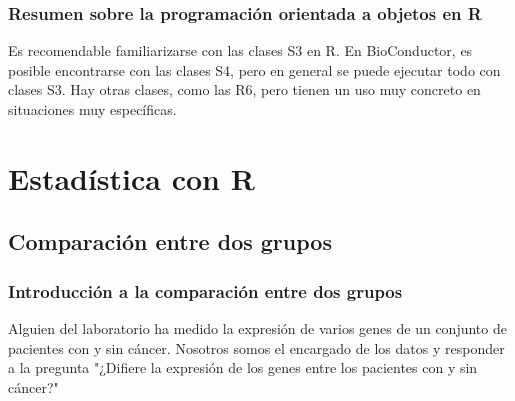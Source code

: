 \documentclass{config/apuntes}\usepackage[]{graphicx}\usepackage[]{xcolor}
\begin{document}
\section{Resumen sobre la programación orientada a objetos en R}
Es recomendable familiarizarse con las clases S3 en R. En BioConductor, es posible encontrarse con las clases S4, pero en general se puede ejecutar todo con clases S3. Hay otras clases, como las R6, pero tienen un uso muy concreto en situaciones muy específicas.

\part{Estadística con R}
\chapter{Comparación entre dos grupos}
\section{Introducción a la comparación entre dos grupos}
Alguien del laboratorio ha medido la expresión de varios genes de un conjunto de pacientes con y sin cáncer. Nosotros somos el encargado de los datos y responder a la pregunta "¿Difiere la expresión de los genes entre los pacientes con y sin cáncer?"
\end{document}
